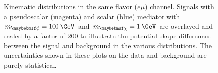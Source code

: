 \begin{figure}
  \caption{Kinematic distributions in the same flavor ($e\mu$) channel. Signals with a pseudoscalar (magenta) and scalar (blue) mediator with $\mMed=100\:\GeV$ and $\mDM=1\:\GeV$ are overlayed and scaled by a factor of 200 to illustrate the potential shape differences between the signal and background in the various distributions. The uncertainties shown in these plots on the data and background are purely statistical.}
  \label{fig:dilep_sr_em}
\end{figure}

